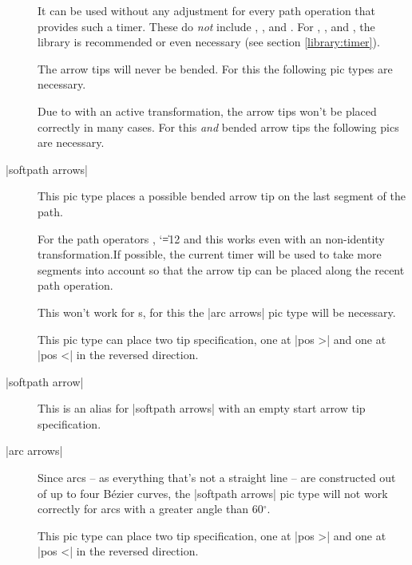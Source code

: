 \begin{multicols}{2}
\begin{description}
  It can be used without any adjustment for every path operation that provides such a timer.
  These do \emph{not} include
  ,
  ,
   and
  .
  For ,
      ,
       and
      ,
  the  library is recommended or even necessary
  (see section \ref{library:timer}).
  
  The arrow tips will never be bended. For this the following pic types are necessary.

  Due to \cite{PgfIssueSloped} with an active transformation,
  the arrow tips won't be placed correctly in many cases.
  For this \emph{and} bended arrow tips the following pics are necessary.
  
\item[|softpath arrows|]
  This pic type places a possible bended arrow tip on the last segment of the path.
  
  For the path operators ,
  {\catcode`\|=12 
              and }
  this works even with an non-identity transformation.If possible, the current timer will be used to take more segments into account so
  that the arrow tip can be placed along the recent path operation.
  
  This won't work for s,
  for this the |arc arrows| pic type will be necessary.
  
  This pic type can place two tip specification,
  one at |pos >| and one at |pos <| in the reversed direction.

\item[|softpath arrow|]
  This is an alias for |softpath arrows| with an empty start arrow tip specification.

\item[|arc arrows|]
  Since arcs -- as everything that's not a straight line --
  are constructed out of up to four Bézier curves,
  the |softpath arrows| pic type will not work correctly for arcs
  with a greater angle than 60${}^\circ$.
  
  This pic type can place two tip specification,
  one at |pos >| and one at |pos <| in the reversed direction.


\end{description}
\end{multicols}
